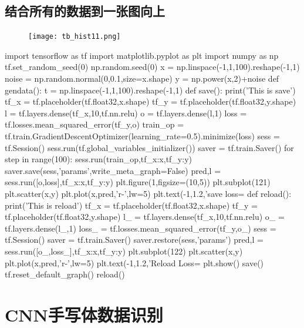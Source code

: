 \subsection{结合所有的数据到一张图向上}
\begin{center}
\begin{figure}[H]
\texttt{[image: tb\_hist11.png]}
\end{figure}
\end{center}


\begin{python}
import tensorflow as tf
import matplotlib.pyplot as plt
import numpy as np
tf.set_random_seed(0)
np.random.seed(0)
x = np.linspace(-1,1,100).reshape(-1,1)
noise = np.random.normal(0,0.1,size=x.shape)
y = np.power(x,2)+noise
def gendata():
    t = np.linspace(-1,1,100).reshape(-1,1)
def save():
    print('This is save')
    tf_x = tf.placeholder(tf.float32,x.shape)
    tf_y = tf.placeholder(tf.float32,y.shape)
    l = tf.layers.dense(tf_x,10,tf.nn.relu)
    o = tf.layers.dense(l,1)
    loss = tf.losses.mean_squared_error(tf_y,o)
    train_op = tf.train.GradientDescentOptimizer(learning_rate=0.5).minimize(loss)
    sess = tf.Session()
    sess.run(tf.global_variables_initializer())
    saver = tf.train.Saver()
    for step in range(100):
        sess.run(train_op,{tf_x:x,tf_y:y})
    saver.save(sess,'params',write_meta_graph=False)
    pred,l = sess.run([o,loss],{tf_x:x,tf_y:y})
    plt.figure(1,figsize=(10,5))
    plt.subplot(121)
    plt.scatter(x,y)
    plt.plot(x,pred,'r-',lw=5)
    plt.text(-1,1.2,'save loss=%
def reload():
    print('This is reload')
    tf_x = tf.placeholder(tf.float32,x.shape)
    tf_y = tf.placeholder(tf.float32,y.shape)
    l_ = tf.layers.dense(tf_x,10,tf.nn.relu)
    o_ = tf.layers.dense(l_,1)
    loss_ = tf.losses.mean_squared_error(tf_y,o_)
    sess = tf.Session()
    saver = tf.train.Saver()
    saver.restore(sess,'params')
    pred,l = sess.run([o_,loss_],{tf_x:x,tf_y:y})
    plt.subplot(122)
    plt.scatter(x,y)
    plt.plot(x,pred,'r-',lw=5)
    plt.text(-1,1.2,'Reload Loss=%
    plt.show()
save()
tf.reset_default_graph()
reload()
\end{python}
\section{CNN手写体数据识别}
